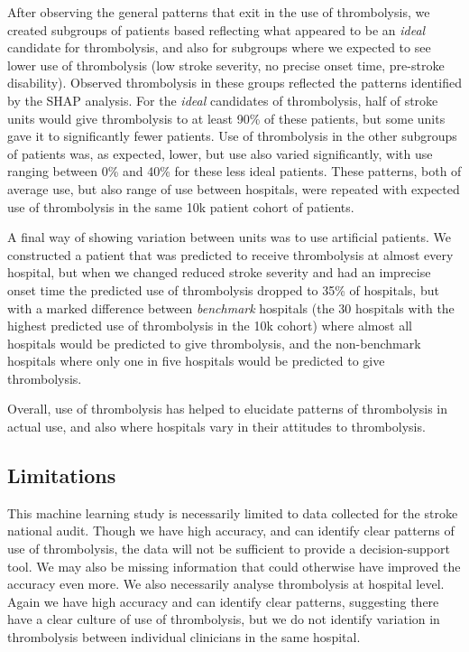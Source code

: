 After observing the general patterns that exit in the use of thrombolysis, we created subgroups of patients based reflecting what appeared to be an \emph{ideal} candidate for thrombolysis, and also for subgroups where we expected to see lower use of thrombolysis (low stroke severity, no precise onset time, pre-stroke disability). Observed thrombolysis in these groups reflected the patterns identified by the SHAP analysis. For the \emph{ideal} candidates of thrombolysis, half of stroke units would give thrombolysis to at least 90\% of these patients, but some units gave it to significantly fewer patients. Use of thrombolysis in the other subgroups of patients was, as expected, lower, but use also varied significantly, with use ranging between 0\% and 40\% for these less ideal patients. These patterns, both of average use, but also range of use between hospitals, were repeated with expected use of thrombolysis in the same 10k patient cohort of patients.

A final way of showing variation between units was to use artificial patients. We constructed a patient that was predicted to receive thrombolysis at almost every hospital, but when we changed reduced stroke severity and had an imprecise onset time the predicted use of thrombolysis dropped to 35\% of hospitals, but with a marked difference between \emph{benchmark} hospitals (the 30 hospitals with the highest predicted use of thrombolysis in the 10k cohort) where almost all hospitals would be predicted to give thrombolysis, and the non-benchmark hospitals where only one in five hospitals would be predicted to give thrombolysis.

Overall, use of thrombolysis has helped to elucidate patterns of thrombolysis in actual use, and also where hospitals vary in their attitudes to thrombolysis.

\subsection{Limitations}

This machine learning study is necessarily limited to data collected for the stroke national audit. Though we have high accuracy, and can identify clear patterns of use of thrombolysis, the data will not be sufficient to provide a decision-support tool. We may also be missing information that could otherwise have improved the accuracy even more. We also necessarily analyse thrombolysis at hospital level. Again we have high accuracy and can identify clear patterns, suggesting there  have a clear culture of use of thrombolysis, but we do not identify variation in thrombolysis between individual clinicians in the same hospital.



